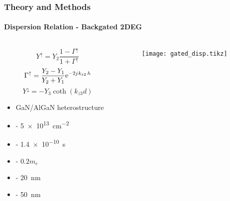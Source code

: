 \documentclass[mathserif,16pt,xcolor=table]{beamer}
\begin{document}
      \begin{frame}
        \frametitle{Theory and Methods}
        \framesubtitle{Dispersion Relation - Backgated 2DEG}
        \begin{columns}[T] %
          \begin{column}{.5\textwidth}
            \begin{equation} \nonumber
              Y^{\uparrow} = Y_{2} \frac{1 - \Gamma^{\uparrow}}{1 + \Gamma^{\uparrow}}
            \end{equation}
            \begin{equation} \nonumber
              \Gamma^{\uparrow} = \frac{Y_2 - Y_1}{Y_2 + Y_1} \mathrm{e}^{-2{j}\mkern1mu k_{z2}\, h}
            \end{equation}
            \begin{equation} \nonumber
              Y^{\downarrow} = - Y_{3} \coth (k_{z3} d)
            \end{equation}
            \begin{itemize}
              \item[] GaN/AlGaN heterostructure
              \item[] { - \SI{5e13}{\cm^{-2}}}
              \item[] {\makebox[.3cm][l]{$\tau$} - \SI{1.4e-10}{\s}}
              \item[] { - $0.2 m_e$}
              \item[] { - \SI{20}{\nm}}
              \item[] { - \SI{50}{\nm}}
            \end{itemize}
          \end{column}
          \begin{column}[T]{.45\textwidth}
            \vspace*{-1cm}
            \begin{figure}
              \centering
              \fontsize{6}{7}\selectfont
              \def\svgwidth{1.\linewidth}
              
            \end{figure}
            \begin{figure} \vspace*{-.5cm} \centering
              \texttt{[image: gated\_disp.tikz]}
              \label{fig:cond_2deg}
            \end{figure}
          \end{column}
        \end{columns}
      \end{frame}
\end{document}
